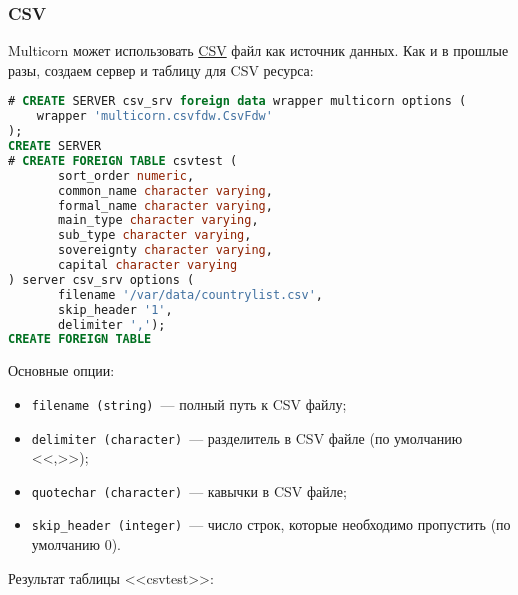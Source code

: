 \subsubsection{CSV}

Multicorn может использовать \href{http://ru.wikipedia.org/wiki/CSV}{CSV} файл как источник данных. Как и в прошлые разы, создаем сервер и таблицу для CSV ресурса:

\begin{lstlisting}[language=SQL,label=lst:pgmulticorn-csv1,caption=Multicorn]
# CREATE SERVER csv_srv foreign data wrapper multicorn options (
    wrapper 'multicorn.csvfdw.CsvFdw'
);
CREATE SERVER
# CREATE FOREIGN TABLE csvtest (
       sort_order numeric,
       common_name character varying,
       formal_name character varying,
       main_type character varying,
       sub_type character varying,
       sovereignty character varying,
       capital character varying
) server csv_srv options (
       filename '/var/data/countrylist.csv',
       skip_header '1',
       delimiter ',');
CREATE FOREIGN TABLE
\end{lstlisting}

Основные опции:

\begin{itemize}
  \item \lstinline!filename (string)!~--- полный путь к CSV файлу;
  \item \lstinline!delimiter (character)!~--- разделитель в CSV файле (по умолчанию <<,>>);
  \item \lstinline!quotechar (character)!~--- кавычки в CSV файле;
  \item \lstinline!skip_header (integer)!~--- число строк, которые необходимо пропустить (по умолчанию 0).
\end{itemize}

Результат таблицы <<csvtest>>:

